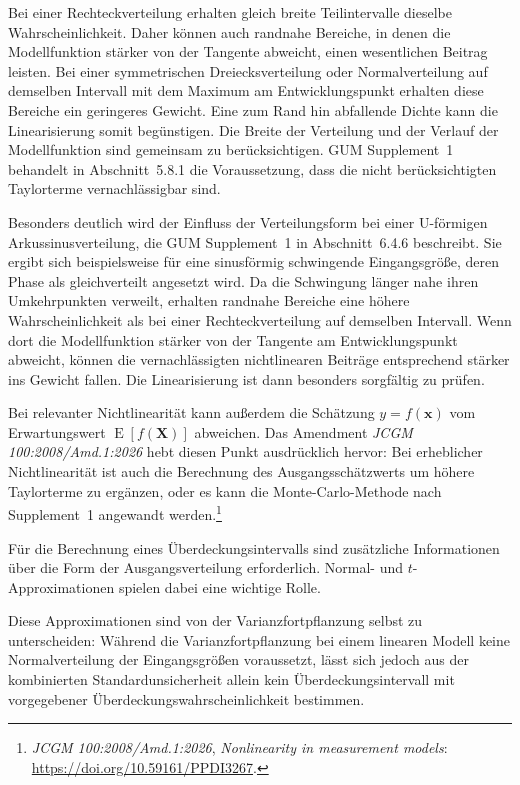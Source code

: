 Bei einer Rechteckverteilung erhalten gleich breite Teilintervalle
dieselbe Wahrscheinlichkeit. Daher können auch randnahe Bereiche, in
denen die Modellfunktion stärker von der Tangente abweicht, einen
wesentlichen Beitrag leisten. Bei einer symmetrischen Dreiecksverteilung oder Normalverteilung
auf demselben Intervall mit dem Maximum am Entwicklungspunkt erhalten
diese Bereiche ein geringeres Gewicht. Eine zum Rand hin abfallende
Dichte kann die Linearisierung somit begünstigen.
Die Breite der Verteilung und der Verlauf der Modellfunktion
sind gemeinsam zu berücksichtigen. GUM Supplement~1 behandelt in
Abschnitt~5.8.1 die Voraussetzung, dass die nicht berücksichtigten
Taylorterme vernachlässigbar sind.

Besonders deutlich wird der Einfluss der Verteilungsform bei einer
U-förmigen Arkussinusverteilung, die GUM Supplement~1 in
Abschnitt~6.4.6 beschreibt. Sie ergibt sich beispielsweise für eine
sinusförmig schwingende Eingangsgröße, deren Phase als gleichverteilt
angesetzt wird. Da die Schwingung länger nahe ihren Umkehrpunkten
verweilt, erhalten randnahe Bereiche eine höhere Wahrscheinlichkeit
als bei einer Rechteckverteilung auf demselben Intervall. Wenn dort
die Modellfunktion stärker von der Tangente am Entwicklungspunkt
abweicht, können die vernachlässigten nichtlinearen Beiträge
entsprechend stärker ins Gewicht fallen. Die Linearisierung ist
dann besonders sorgfältig zu prüfen.

Bei relevanter Nichtlinearität kann außerdem die Schätzung
$y=f(\mathbf x)$ vom Erwartungswert
$\operatorname E[f(\mathbf X)]$ abweichen. Das Amendment
\textsl{JCGM 100:2008/Amd.1:2026} hebt diesen Punkt ausdrücklich hervor:
Bei erheblicher Nichtlinearität ist auch die Berechnung des
Ausgangsschätzwerts um höhere Taylorterme zu ergänzen, oder es kann
die Monte-Carlo-Methode nach Supplement~1 angewandt werden.\footnote{
\textsl{JCGM 100:2008/Amd.1:2026},
\textsl{Nonlinearity in measurement models}:
\url{https://doi.org/10.59161/PPDI3267}.}

Für die Berechnung eines Überdeckungsintervalls sind zusätzliche Informationen
über die Form der Ausgangsverteilung erforderlich. Normal- und
$t$-Approximationen spielen dabei eine wichtige Rolle. 

Diese Approximationen sind von der Varianzfortpflanzung selbst zu unterscheiden: Während die Varianzfortpflanzung bei einem linearen Modell keine
Normalverteilung der Eingangsgrößen voraussetzt, lässt sich jedoch aus der kombinierten Standardunsicherheit allein kein Überdeckungsintervall
mit vorgegebener Überdeckungswahrscheinlichkeit bestimmen.

